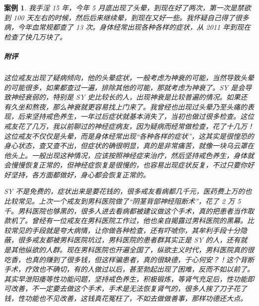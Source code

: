 \documentclass{ctexart}
\newtheorem{case}{案例}
\begin{document}
\begin{case}
    我手淫 15 年，今年 5 月底出现了头晕，到现在好了两次，第一次是禁欲到 100 天左右的时候，然后后来继续晕，到现在又好一些。我怀疑自己得了很多病，今年血常规都查了 13 次。身体经常出现各种各样的症状，从 2011 年到现在检查了快几万块了。
    \subparagraph{附评} 这位戒友出现了疑病倾向，他的头晕症状，一般考虑为神衰的可能，当然导致头晕的可能很多，如果都查过一遍，排除其他的可能，那就考虑为神衰了。SY 是会导致神经衰弱的，特别是 SY 史比较长的人，出现神衰是比较普遍的情况。如果还有久坐和熬夜，那么神衰就更容易找上门来了。我曾经也出现过头晕乃至头痛的表现，后来坚持戒色养生，一年过后症状就基本消失了，当初也做过很多检查。这位戒友花了几万，我以前聊过的神经症病友，因为疑病而经常做检查，花了十几万！这位戒友不仅仅是头晕，而是身体经常出现“各种各样的症状”，这其实是很惶恐的身心状态，查又查不出，但症状的确很明显，真的是非常痛苦，就像一块乌云罩在他头上。一般出现这种情况，应该按照神经症来治疗，然后坚持戒色养生，身体就会慢慢恢复正常的，但神经症恢复是很慢的，也容易出现症状反复，不过只要你好好坚持，各方面都做好，身心都会恢复正常的。

    SY 不是免费的，症状出来是要花钱的，很多戒友看病都几千元，医药费上万的也比较常见。上次一个戒友到男科医院做了“阴茎背部神经阻断术”，花了 2 万 5 千。男科医院也够黑的，很多人进去看病都被建议做这个手术，真的把患者当作取款机了。曾经有一位戒友在男科医院工作过，他也亲自揭露过男科医院的黑幕。比较常见的手段就是夸大病情，让你做各种检查，还有吓唬你，其牟利手段十分隐蔽，很多戒友都被男科医院坑过，男科医院的患者群其实正是 SY 的人，还有就是其他纵欲的人群。现在男科医院也开遍全国了，纵欲主义时代，男科医院真的很吃香，也真的赚到了很多钱，但这样骗患者，真的很缺德，于心何安？！这个背断手术，疗效也不确切，有的人做过以后，甚至勃起出现了困难，反而不如以前了。其实早泄阳痿等性功能问题，坚持戒色养生，积极锻炼，等肾气充足后，性功能即可改善，不一定要去做这个手术，手术是无法恢复肾气的，很多人挨了刀子花了钱，性功能也不见改善，这钱真花冤枉了，不如去做做善事，那样功德还大点。
\end{case}
\end{document}
